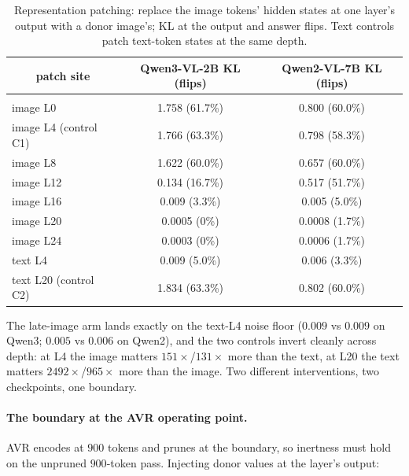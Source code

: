 \begin{table}[t]
\caption{Representation patching: replace the image tokens' hidden states at one layer's output with a donor
image's; KL at the output and answer flips. Text controls patch text-token states at the same depth.}
\label{tab:patch}
\begin{center}
\small
\begin{tabular}{lcc}
\multicolumn{1}{c}{\bf patch site} &\multicolumn{1}{c}{\bf Qwen3-VL-2B KL (flips)} &\multicolumn{1}{c}{\bf Qwen2-VL-7B KL (flips)}
\\ \hline \\
image L0 & 1.758 (61.7\%) & 0.800 (60.0\%)\\
image L4 (control C1) & 1.766 (63.3\%) & 0.798 (58.3\%)\\
image L8 & 1.622 (60.0\%) & 0.657 (60.0\%)\\
image L12 & 0.134 (16.7\%) & 0.517 (51.7\%)\\
image L16 & 0.009 (3.3\%) & 0.005 (5.0\%)\\
image L20 & 0.0005 (0\%) & 0.0008 (1.7\%)\\
image L24 & 0.0003 (0\%) & 0.0006 (1.7\%)\\
text L4 & 0.009 (5.0\%) & 0.006 (3.3\%)\\
text L20 (control C2) & 1.834 (63.3\%) & 0.802 (60.0\%)\\
\end{tabular}
\end{center}
\end{table}

The late-image arm lands exactly on the text-L4 noise floor ($0.009$ vs $0.009$ on Qwen3; $0.005$ vs $0.006$ on
Qwen2), and the two controls invert cleanly across depth: at L4 the image matters $151\times$/$131\times$ more
than the text, at L20 the text matters $2492\times$/$965\times$ more than the image. Two different
interventions, two checkpoints, one boundary.

\paragraph{The boundary at the AVR operating point.} AVR encodes at $900$ tokens and prunes at the boundary, so
inertness must hold on the unpruned $900$-token pass. Injecting donor values at the layer's output:

